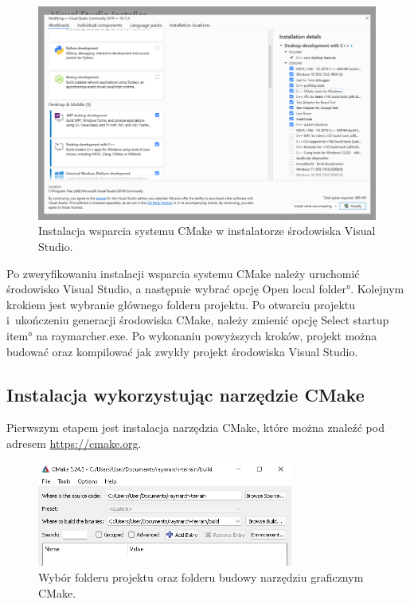 \begin{figure}
\centering
\includegraphics[width=1\textwidth]{./graf/vscmakeinstall.png}
\caption{Instalacja wsparcia systemu CMake w instalatorze środowiska Visual Studio.}
\label{fig:vs-cmake-install}
\end{figure}

Po zweryfikowaniu instalacji wsparcia systemu CMake należy uruchomić środowisko Visual Studio, a następnie wybrać opcję \ang{Open local folder}. Kolejnym krokiem jest wybranie głównego folderu projektu. Po otwarciu projektu i~ukończeniu generacji środowiska CMake, należy zmienić opcję \ang{Select startup item} na raymarcher.exe. Po wykonaniu powyższych kroków, projekt można budować oraz kompilować jak zwykły projekt środowiska Visual Studio.

\subsection{Instalacja wykorzystując narzędzie CMake}
Pierwszym etapem jest instalacja narzędzia CMake, które można znaleźć pod adresem \url{https://cmake.org}.

\begin{figure}
\centering
\includegraphics[width=0.75\textwidth]{./graf/cmake-win.png}
\caption{Wybór folderu projektu oraz folderu budowy narzędziu graficznym CMake.}
\label{fig:cmake-win}
\end{figure}

